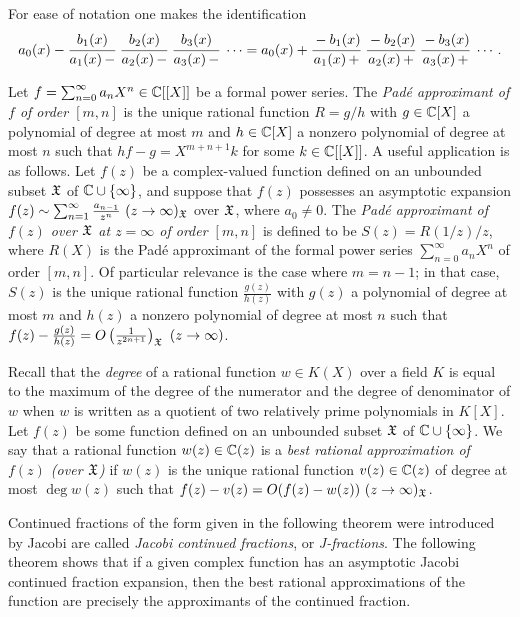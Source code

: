 \documentclass[12pt]{article}
\begin{document}
For ease of notation one makes the identification
\begin{align*}
a_0(x) - \cfrac{b_1(x)}{a_1(x) \, -} \ \cfrac{b_2(x)}{a_2(x)\, -} \ \cfrac{b_3(x)}{a_3(x)\, -}  \ \cdots = 
a_0(x) + \cfrac{-b_1(x)}{a_1(x) \, +} \ \cfrac{-b_2(x)}{a_2(x)\, +} \ \cfrac{-b_3(x)}{a_3(x)\, +}  \ \cdots.
\end{align*}

Let $f = \sum_{n = 0}^\infty a_n X^n \in {\mathbb C}[[X]]$ be a formal power series. The {\it Pad\'e approximant of $f$ of order $[m,n]$} is the unique rational function $R = g/h$ with $g \in {\mathbb C}[X]$ a polynomial of degree at most $m$ and $h \in {\mathbb C}[X]$ a nonzero polynomial of degree at most $n$ such that $hf-g = X^{m+n+1}k$ for some $k \in  {\mathbb C}[[X]]$.    A useful application is as follows.  Let $f(z)$ be a complex-valued function defined on an unbounded subset ${\mathfrak X}$ of ${\mathbb C} \cup \{ \infty\}$, and suppose that $f(z)$ possesses an asymptotic expansion $f(z) \sim \sum_{n = 1}^\infty \frac{a_{n-1}}{ z^n} \ (z \to \infty)_{\mathfrak X}$ over ${\mathfrak X}$, where $a_0 \neq 0$.  The {\it Pad\'e approximant of $f(z)$ over ${\mathfrak X}$ at $z = \infty$ of order $[m,n]$} is defined to be $S(z) = R(1/z)/z$, where $R(X)$ is the Pad\'e approximant of  the formal power series $\sum_{n = 0}^\infty a_n X^n$ of  order $[m,n]$.  Of particular relevance is the case where $m = n-1$; in that case, $S(z)$ is the unique rational function $\frac{g(z)}{h(z)}$  with $g(z)$ a polynomial of degree at most $m$ and $h(z)$ a nonzero polynomial of degree at most $n$ such that  $f(z)-\frac{g(z)}{h(z)} = O\left(\frac{1}{z^{2n+1}}\right)_{\mathfrak X} \ (z \to \infty)$.


Recall that the {\it degree} of a rational function $w \in K(X)$ over a field $K$ is equal to the maximum of the degree of the numerator and  the degree of denominator of $w$ when $w$ is written as a quotient of two relatively prime polynomials in $K[X]$.  Let $f(z)$ be some function defined on an unbounded subset ${\mathfrak X}$ of ${\mathbb C} \cup \{\infty\}$.  We say that a rational  function $w(z) \in {\mathbb C}(z)$ is a {\it best rational approximation of $f(z)$ (over ${\mathfrak X}$)}  if $w(z)$ is the unique rational function $v(z) \in {\mathbb C}(z)$  of degree at most $\deg w(z)$  such that $f(z)-v(z) = O(f(z)-w(z)) \ (z \to \infty)_{\mathfrak X}$.    




Continued fractions of the form given in the following theorem were introduced by Jacobi are called {\it Jacobi continued fractions}, or {\it J-fractions}.  The following theorem shows that if a given complex function has an asymptotic Jacobi continued fraction expansion, then the best rational approximations of the function are precisely the approximants of the continued fraction.
\end{document}

